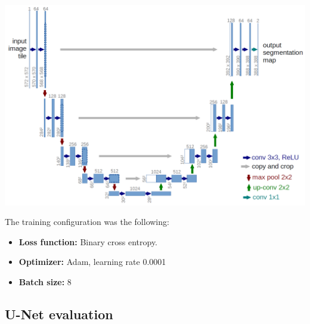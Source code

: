 \begin{center}
\hspace*{15pt}
\includegraphics[width=\textwidth]{images/unet.png}
\end{center}

The training configuration was the following:
\begin{itemize}
    \item \textbf{Loss function: } Binary cross entropy.
    \item \textbf{Optimizer: } Adam, learning rate 0.0001
    \item \textbf{Batch size: } 8
\end{itemize}

\newpage
\subsection{U-Net evaluation}


